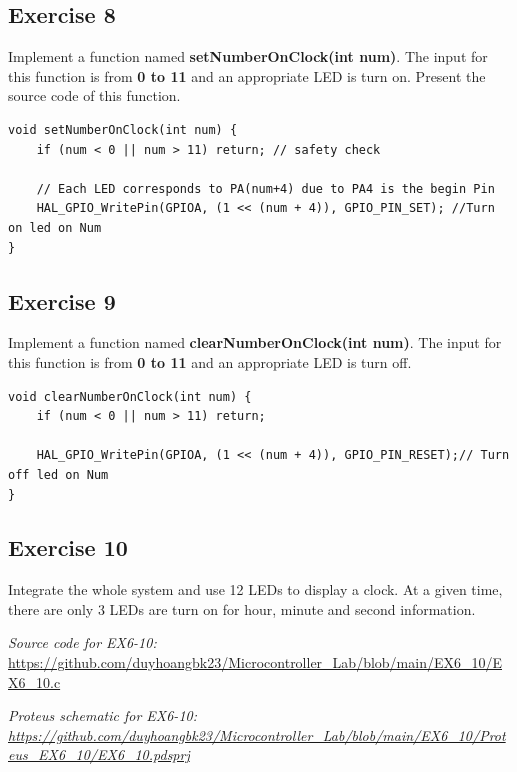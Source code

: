 \subsection{Exercise 8}
Implement a function named \textbf{setNumberOnClock(int num)}. The input for this function is from \textbf{0 to 11} and an appropriate LED is turn on. Present the source code of this function.
\begin{lstlisting}[caption=Set Number on Clock function]
void setNumberOnClock(int num) {
    if (num < 0 || num > 11) return; // safety check

    // Each LED corresponds to PA(num+4) due to PA4 is the begin Pin
    HAL_GPIO_WritePin(GPIOA, (1 << (num + 4)), GPIO_PIN_SET); //Turn on led on Num
}
\end{lstlisting}


\subsection{Exercise 9}
Implement a function named \textbf{clearNumberOnClock(int num)}. The input for this function is from \textbf{0 to 11} and an appropriate LED is turn off. 

\begin{lstlisting}[caption=Clear Number on Clock function]
void clearNumberOnClock(int num) {
    if (num < 0 || num > 11) return;

    HAL_GPIO_WritePin(GPIOA, (1 << (num + 4)), GPIO_PIN_RESET);// Turn off led on Num
}
\end{lstlisting}
\subsection{Exercise 10}
Integrate the whole system and use 12 LEDs to display a clock. At a given time, there are only 3 LEDs are turn on for hour, minute and second information.

\textit{Source code for EX6-10:} \url{https://github.com/duyhoangbk23/Microcontroller_Lab/blob/main/EX6_10/EX6_10.c}

\textit{Proteus schematic for EX6-10: \url{https://github.com/duyhoangbk23/Microcontroller_Lab/blob/main/EX6_10/Proteus_EX6_10/EX6_10.pdsprj}}
